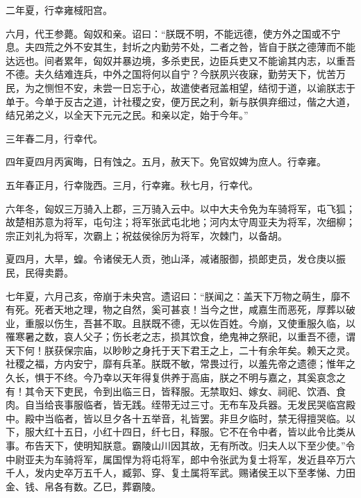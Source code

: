 \documentclass[12pt,UTF8]{ctexbook}
\begin{document}
二年夏，行幸雍棫阳宫。



六月，代王参薨。匈奴和亲。诏曰：“朕既不明，不能远德，使方外之国或不宁息。夫四荒之外不安其生，封圻之内勤劳不处，二者之咎，皆自于朕之德薄而不能达远也。间者累年，匈奴并暴边境，多杀吏民，边臣兵吏又不能谕其内志，以重吾不德。夫久结难连兵，中外之国将何以自宁？今朕夙兴夜寐，勤劳天下，忧苦万民，为之恻怛不安，未尝一日忘于心，故遣使者冠盖相望，结彻于道，以谕朕志于单于。今单于反古之道，计社稷之安，便万民之利，新与朕俱弃细过，偕之大道，结兄弟之义，以全天下元元之民。和亲以定，始于今年。”



三年春二月，行幸代。



四年夏四月丙寅晦，日有蚀之。五月，赦天下。免官奴婢为庶人。行幸雍。



五年春正月，行幸陇西。三月，行幸雍。秋七月，行幸代。



六年冬，匈奴三万骑入上郡，三万骑入云中。以中大夫令免为车骑将军，屯飞狐；故楚相苏意为将军，屯句注；将军张武屯北地；河内太守周亚夫为将军，次细柳；宗正刘礼为将军，次霸上；祝兹侯徐厉为将军，次棘门，以备胡。



夏四月，大旱，蝗。令诸侯无人贡，弛山泽，减诸服御，损郎吏员，发仓庚以振民，民得卖爵。



七年夏，六月己亥，帝崩于未央宫。遗诏曰：“朕闻之：盖天下万物之萌生，靡不有死。死者天地之理，物之自然，奚可甚哀！当今之世，咸嘉生而恶死，厚葬以破业，重服以伤生，吾甚不取。且朕既不德，无以佐百姓。今崩，又使重服久临，以罹寒暑之数，哀人父子；伤长老之志，损其饮食，绝鬼神之祭祀，以重吾不德，谓天下何！朕获保宗庙，以眇眇之身托于天下君王之上，二十有余年矣。赖天之灵。社稷之福，方内安宁，靡有兵革。朕既不敏，常畏过行，以羞先帝之遗德；惟年之久长，惧于不终。今乃幸以天年得复供养于高庙，朕之不明与嘉之，其奚哀念之有！其令天下吏民，令到出临三日，皆释服。无禁取妇、嫁女、祠祀、饮酒、食肉。自当给丧事服临者，皆无践。绖带无过三寸。无布车及兵器。无发民哭临宫殿中。殿中当临者，皆以旦夕各十五举音，礼皆罢。非旦夕临时，禁无得擅哭临。以下，服大红十五日，小红十四日，纤七日，释服。它不在令中者，皆以此令比类从事。布告天下，使明知朕意。霸陵山川因其故，无有所改。归夫人以下至少使。”令中尉亚夫为车骑将军，属国悍为将屯将军，郎中令张武为复士将军，发近县卒万六千人，发内史卒万五千人，臧郭、穿、复土属将军武。赐诸侯王以下至孝悌、力田金、钱、帛各有数。乙巳，葬霸陵。
\end{document}
